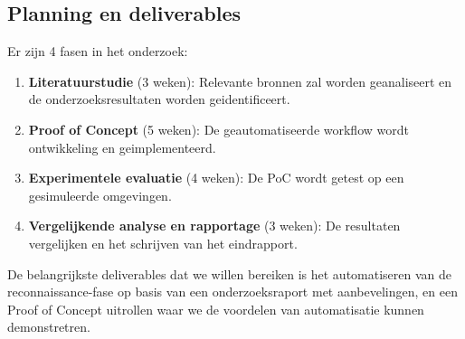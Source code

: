 \subsection{Planning en deliverables}
Er zijn 4 fasen in het onderzoek:
\begin{enumerate}
    \item \textbf{Literatuurstudie} (3 weken): Relevante bronnen zal worden geanaliseert en de onderzoeksresultaten worden geidentificeert.
    \item \textbf{Proof of Concept} (5 weken): De geautomatiseerde workflow wordt ontwikkeling en geimplementeerd.
    \item \textbf{Experimentele evaluatie} (4 weken): De PoC wordt getest op een gesimuleerde omgevingen.
    \item \textbf{Vergelijkende analyse en rapportage} (3 weken): De resultaten vergelijken en het schrijven van het eindrapport.
\end{enumerate}

De belangrijkste deliverables dat we willen bereiken is het automatiseren van de reconnaissance-fase op 
basis van een onderzoeksraport met aanbevelingen, en een Proof of Concept uitrollen waar we de voordelen 
van automatisatie kunnen demonstretren.







